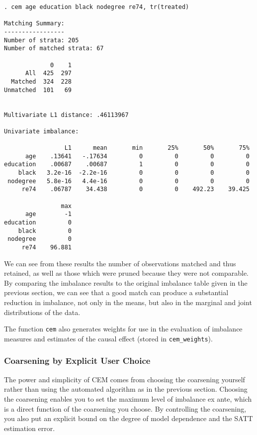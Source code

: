 \documentclass[11pt]{article}
\begin{document}
\begin{verbatim}
. cem age education black nodegree re74, tr(treated)

Matching Summary:
-----------------
Number of strata: 205
Number of matched strata: 67

             0    1
      All  425  297
  Matched  324  228
Unmatched  101   69


Multivariate L1 distance: .46113967

Univariate imbalance:

                 L1      mean       min       25%       50%       75%
      age    .13641   -.17634         0         0         0         0
education    .00687    .00687         1         0         0         0
    black   3.2e-16  -2.2e-16         0         0         0         0
 nodegree   5.8e-16   4.4e-16         0         0         0         0
     re74    .06787    34.438         0         0    492.23    39.425

                max
      age        -1
education         0
    black         0
 nodegree         0
     re74    96.881

\end{verbatim}


We can see from these results the number of observations matched and
thus retained, as well as those which were pruned because they were
not comparable.  By comparing the imbalance results to the original
imbalance table given in the previous section, we can see that a good
match can produce a substantial reduction in imbalance, not only in
the means, but also in the marginal and joint distributions of the
data.

The function \texttt{cem} also generates weights for use in the
evaluation of imbalance measures and estimates of the causal effect
(stored in \texttt{cem\_weights}).

\subsubsection{Coarsening by Explicit User Choice}\label{s:cem-user}

The power and simplicity of CEM comes from choosing the coarsening
yourself rather than using the automated algorithm as in the previous
section.  Choosing the coarsening enables you to set the maximum level
of imbalance ex ante, which is a direct function of the coarsening you
choose.  By controlling the coarsening, you also put an explicit bound
on the degree of model dependence and the SATT estimation error.
\end{document}
